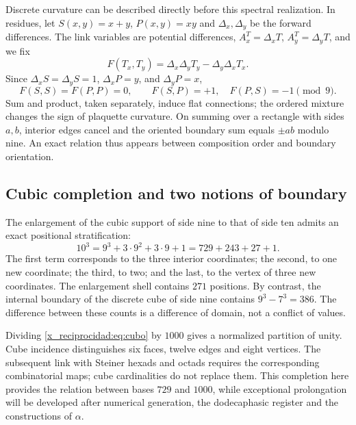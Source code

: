 Discrete curvature can be described directly before this spectral realization. In residues, let \(S(x,y)=x+y\), \(P(x,y)=xy\) and \(\Delta_x,\Delta_y\) be the forward differences. The link variables are potential differences, \(A_x^T=\Delta_xT\), \(A_y^T=\Delta_yT\), and we fix
\[
 F(T_x,T_y)=\Delta_x\Delta_yT_y-\Delta_y\Delta_xT_x.
\]
Since \(\Delta_xS=\Delta_yS=1\), \(\Delta_xP=y\), and \(\Delta_yP=x\),
\begin{equation}
 F(S,S)=F(P,P)=0,\qquad F(S,P)=+1,\quad F(P,S)=-1\pmod9.
\end{equation}
Sum and product, taken separately, induce flat connections; the ordered mixture changes the sign of plaquette curvature. On summing over a rectangle with sides \(a,b\), interior edges cancel and the oriented boundary sum equals \(\pm ab\) modulo nine. An exact relation thus appears between composition order and boundary orientation.

\subsection{Cubic completion and two notions of boundary}

The enlargement of the cubic support of side nine to that of side ten admits an exact positional stratification:
\begin{equation}
 10^3=9^3+3\cdot9^2+3\cdot9+1=729+243+27+1.
 \label{x_reciprocidad:eq:cubo}
\end{equation}
The first term corresponds to the three interior coordinates; the second, to one new coordinate; the third, to two; and the last, to the vertex of three new coordinates. The enlargement shell contains \(271\) positions. By contrast, the internal boundary of the discrete cube of side nine contains \(9^3-7^3=386\). The difference between these counts is a difference of domain, not a conflict of values.

Dividing \eqref{x_reciprocidad:eq:cubo} by \(1000\) gives a normalized partition of unity. Cube incidence distinguishes six faces, twelve edges and eight vertices. The subsequent link with Steiner hexads and octads requires the corresponding combinatorial maps; cube cardinalities do not replace them. This completion here provides the relation between bases \(729\) and \(1000\), while exceptional prolongation will be developed after numerical generation, the dodecaphasic register and the constructions of \(\alpha\).



